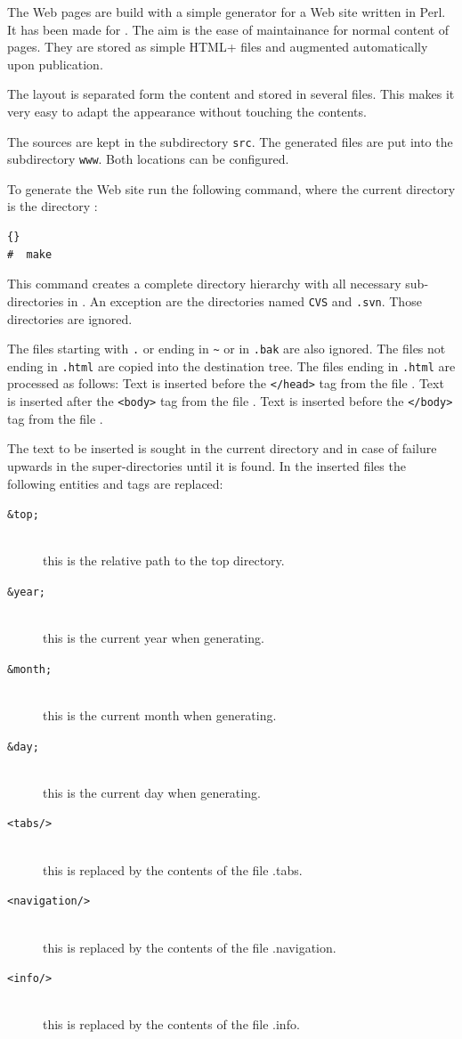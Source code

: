 The Web pages are build with a simple generator for a Web site written
in Perl. It has been made for \ExTeX. The aim is the ease of
maintainance for normal content of pages. They are stored as simple
\+HTML+ files and augmented automatically upon publication.

The layout is separated form the content and stored in several files.
This makes it very easy to adapt the appearance without touching the
contents.

The sources are kept in the subdirectory \texttt{src}. The generated
files are put into the subdirectory \texttt{www}. Both locations can
be configured.

To generate the Web site run the following command, where the current
directory is the directory :

\begin{lstlisting}{}
#  make
\end{lstlisting}{}

This command creates a complete directory hierarchy with all necessary
sub-di\-rec\-to\-ries in . An exception are the
directories named \texttt{CVS} and \texttt{.svn}. Those directories
are ignored.

The files starting with \verb|.| or ending in \verb|~| or in
\texttt{.bak} are also ignored. The files not ending in \verb|.html|
are copied into the destination tree. The files ending in \verb|.html|
are processed as follows: Text is inserted before the \verb|</head>|
tag from the file . Text is inserted after the
\verb|<body>| tag from the file . Text is inserted
before the \verb|</body>| tag from the file .

The text to be inserted is sought in the current directory and in case
of failure upwards in the super-directories until it is found. In the
inserted files the following entities and tags are replaced:

\begin{description}
\item [\tt\&top;]\ \\
  this is the relative path to the top directory.
\item [\tt\&year;]\ \\
  this is the current year when generating.
\item [\tt\&month;]\ \\
  this is the current month when generating.
\item [\tt\&day;]\ \\
  this is the current day when generating.
\item [\tt<tabs/>]\ \\
  this is replaced by the contents of the file .tabs.
\item [\tt<navigation/>]\ \\
  this is replaced by the contents of the file .navigation.
\item [\tt<info/>]\ \\
  this is replaced by the contents of the file .info.
\end{description}

